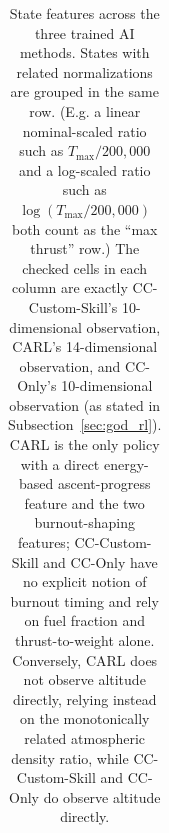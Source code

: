 \documentclass[mnsc,sglanonrev]{informs4}
\begin{document}
\begin{APPENDICES}
\begin{table}[H]
\begin{tabular}{@{}p{}ccc@{}}
\end{tabular}
\caption{State features across the three trained AI methods. States with related normalizations are grouped in the same row. (E.g. a linear nominal-scaled ratio such as $T_{\max}/200{,}000$ and a log-scaled ratio such as $\log(T_{\max}/200{,}000)$ both count as the ``max thrust'' row.) The checked cells in each column are exactly CC-Custom-Skill's 10-dimensional observation, CARL's 14-dimensional observation, and CC-Only's 10-dimensional observation (as stated in Subsection~\ref{sec:god_rl}). CARL is the only policy with a direct energy-based ascent-progress feature and the two burnout-shaping features; CC-Custom-Skill and CC-Only have no explicit notion of burnout timing and rely on fuel fraction and thrust-to-weight alone. Conversely, CARL does not observe altitude directly, relying instead on the monotonically related atmospheric density ratio, while CC-Custom-Skill and CC-Only do observe altitude directly.}
\label{tab:god-state-features}
\end{table}


\end{APPENDICES}
\end{document}
